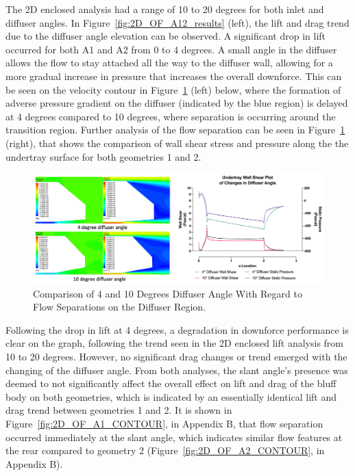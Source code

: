 \noindent The 2D enclosed analysis had a range of 10 to 20 degrees for both inlet and diffuser angles. In Figure~\ref{fig:2D_OF_A12_results} (left), the lift and drag trend due to the diffuser angle elevation can be observed. A significant drop in lift occurred for both A1 and A2 from 0 to 4 degrees. A small angle in the diffuser allows the flow to stay attached all the way to the diffuser wall, allowing for a more gradual increase in pressure that increases the overall downforce. This can be seen on the velocity contour in Figure~\ref{fig:2D_OF_10_4_Contour_compare} (left) below, where the formation of adverse pressure gradient on the diffuser (indicated by the blue region) is delayed at 4 degrees compared to 10 degrees, where separation is occurring around the transition region. Further analysis of the flow separation can be seen in Figure~\ref{fig:2D_OF_10_4_Contour_compare} (right), that shows the comparison of wall shear stress and pressure along the the undertray surface for both geometries 1 and 2. 

\begin{figure}[!htb]
    \centering
    \includegraphics[scale=0.52]{Figures/2D_OF/10_4_O_COMPARE CONTOUR.PNG}
    \caption{Comparison of 4 and 10 Degrees Diffuser Angle With Regard to Flow Separations on the Diffuser Region.}
    \label{fig:2D_OF_10_4_Contour_compare}
\end{figure}

\noindent Following the drop in lift at 4 degrees, a degradation in downforce performance is clear on the graph, following the trend seen in the 2D enclosed lift analysis from 10 to 20 degrees. However, no significant drag changes or trend emerged with the changing of the diffuser angle. From both analyses, the slant angle's presence was deemed to not significantly affect the overall effect on lift and drag of the bluff body on both geometries, which is indicated by an essentially identical lift and drag trend between geometries 1 and 2. It is shown in Figure~\ref{fig:2D_OF_A1_CONTOUR}, in Appendix B, that flow separation occurred immediately at the slant angle, which indicates similar flow features at the rear compared to geometry 2 (Figure~\ref{fig:2D_OF_A2_CONTOUR}, in Appendix B). 

